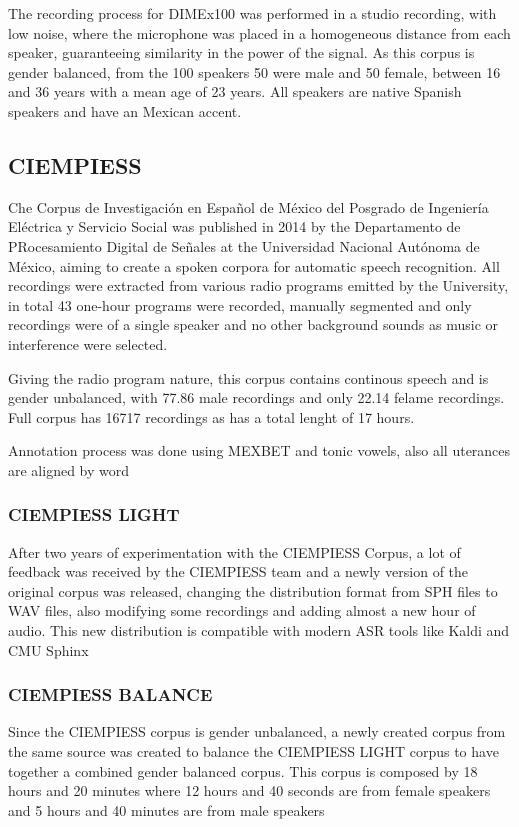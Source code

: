 \documentclass[10pt, a4paper]{article}
\begin{document}
The recording process for DIMEx100 was performed in a studio recording, with low noise, where the microphone was placed in a homogeneous distance from each speaker, guaranteeing similarity in the power of the signal. As this corpus is gender balanced, from the 100 speakers 50 were male and 50 female, between 16 and 36 years with a mean age of 23 years. All speakers are native Spanish speakers and have an Mexican accent.

\subsection{CIEMPIESS}

Che Corpus de Investigación en Español de México del Posgrado de Ingeniería Eléctrica y Servicio Social was published in 2014 by  the Departamento de PRocesamiento Digital de Señales at the Universidad Nacional Autónoma de México, aiming to create a spoken corpora for automatic speech recognition. All recordings were extracted from various radio programs emitted by the University, in total 43 one-hour programs were recorded, manually segmented and only recordings were of a single speaker and no other background sounds as music or interference were selected.

Giving the radio program nature, this corpus contains continous speech and is gender unbalanced, with 77.86 male recordings and only 22.14 felame recordings. Full corpus has 16717 recordings as has a total lenght of 17 hours.

Annotation process was done using MEXBET and tonic vowels, also all uterances are aligned by word

\subsubsection{CIEMPIESS LIGHT}

After two years of experimentation with the CIEMPIESS Corpus, a lot of feedback was received by the CIEMPIESS team and a newly version of the original corpus was released, changing the distribution format from SPH files to WAV files, also modifying some recordings and adding almost a new hour of audio. This new distribution is compatible with modern ASR tools like Kaldi and CMU Sphinx

\subsubsection{CIEMPIESS BALANCE}

Since the CIEMPIESS corpus is gender unbalanced, a newly created corpus from the same source was created to balance the CIEMPIESS LIGHT corpus to have together a combined gender balanced corpus. This corpus is composed by 18 hours and 20 minutes where 12 hours and 40 seconds are from female speakers and 5 hours and 40 minutes are from male speakers
\end{document}
